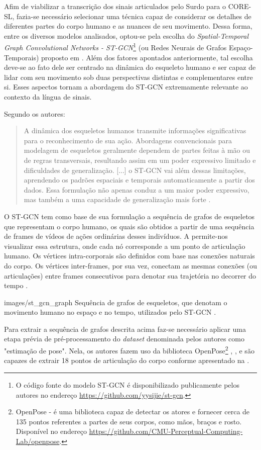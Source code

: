 Afim de viabilizar a transcrição dos sinais articulados pelo Surdo para o CORE-SL, fazia-se necessário selecionar uma técnica capaz de considerar os detalhes de diferentes partes do corpo humano e as nuances de seu movimento. Dessa forma, entre os diversos modelos analisados, optou-se pela escolha do \textit{Spatial-Temporal Graph Convolutional Networks - ST-GCN}\footnote{
    O código fonte do modelo ST-GCN é disponibilizado publicamente pelos autores no endereço \url{https://github.com/yysijie/st-gcn}.
} (ou Redes Neurais de Grafos Espaço-Temporais) proposto em \cite{st-gcn-2018}. Além dos fatores apontados anteriormente, tal escolha deve-se ao fato dele ser centrado na dinâmica do esqueleto humano e ser capaz de lidar com seu movimento sob duas perspectivas distintas e complementares entre si. Esses aspectos tornam a abordagem do ST-GCN extremamente relevante ao contexto da língua de sinais.

Segundo os autores:
\begin{quote}
A dinâmica dos esqueletos humanos transmite informações significativas para o reconhecimento de sua ação. Abordagens convencionais para modelagem de esqueletos geralmente dependem de partes feitas à mão ou de regras transversais, resultando assim em um poder expressivo limitado e dificuldades de generalização. [...] o ST-GCN vai além dessas limitações, aprendendo os padrões espaciais e temporais automaticamente a partir dos dados. Essa formulação não apenas conduz a um maior poder expressivo, mas também a uma capacidade de generalização mais forte \cite{st-gcn-2018}.
\end{quote}

O ST-GCN tem como base de sua formulação a sequência de grafos de esqueletos que representam o corpo humano, os quais são obtidos a partir de uma sequência de frames de vídeos de ações ordinárias desses indivíduos. A  permite-nos visualizar essa estrutura, onde cada nó corresponde a um ponto de articulação humano. Os vértices intra-corporais são definidos com base nas conexões naturais do corpo. Os vértices inter-frames, por sua vez, conectam as mesmas conexões (ou articulações) entre frames consecutivos para denotar sua trajetória no decorrer do tempo \cite{st-gcn-2018}.

    {images/st_gcn_graph}
    {Sequência de grafos de esqueletos, que denotam o movimento humano no espaço e no tempo, utilizados pelo ST-GCN \cite{st-gcn-2018}.}

Para extrair a sequência de grafos descrita acima faz-se necessário aplicar uma etapa prévia de pré-processamento do \textit{dataset} denominada pelos autores como "estimação de pose". Nela, os autores fazem uso da biblioteca OpenPose\footnote{
	OpenPose - é uma biblioteca capaz de detectar os atores e fornecer cerca de 135 pontos referentes a partes de seus corpos, como mãos, braços e rosto. Disponível no endereço \url{https://github.com/CMU-Perceptual-Computing-Lab/openpose}.
} \cite{cao-realtime-2017}, \cite{simon-hand-2017}, \cite{wei-cpm-2016} e são capazes de extrair 18 pontos de articulação do corpo conforme apresentado na .

